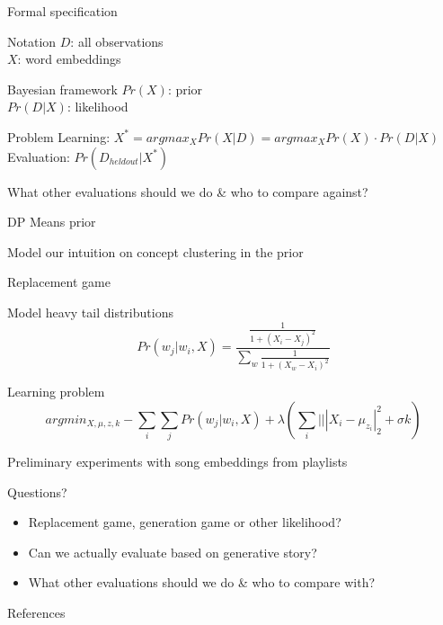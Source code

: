 \documentclass{beamer}
\begin{document}
\begin{frame}{Formal specification}
  \begin{block}{Notation}
    $D$: all observations\\
    $X$: word embeddings
  \end{block}
  \begin{block}{Bayesian framework}
    $Pr(X)$: prior\\
    $Pr(D | X)$: likelihood
  \end{block}
  \begin{block}{Problem}
    Learning: $X^* = argmax_{ X } Pr(X | D) = argmax_{ X } Pr(X) \cdot Pr(D | X)$\\
    Evaluation: $Pr(D_{heldout}|X^*)$
  \end{block}
\pause
What other evaluations should we do \& who to compare against?
\end{frame}

\begin{frame}{DP Means prior}
  \begin{block}{Model our intuition on concept clustering in the prior}
  \end{block}
\end{frame}

\begin{frame}{Replacement game}
  \begin{block}{Model heavy tail distributions}
    $$Pr(w_j|w_i, X) = \frac{\frac{1}{1+(X_i-X_j)^2}}{\sum_{w}\frac{1}{1+(X_w-X_i)^2}}$$
  \end{block}
  \pause
  \begin{block}{Learning problem}
    $$argmin_{X, \mu, z, k} -\sum_{i}\sum_{j}Pr(w_j|w_i, X)+\lambda(\sum_i|||X_i-\mu_{z_i}|_2^2 + \sigma k)$$
  \end{block}
\end{frame}

\begin{frame}{Preliminary experiments with song embeddings from playlists}
\end{frame}

\begin{frame}{Questions?}
  \begin{itemize}
    \item Replacement game, generation game or other likelihood?
    \item Can we actually evaluate based on generative story?
    \item What other evaluations should we do \& who to compare with?
  \end{itemize}
\end{frame}

\begin{frame}[allowframebreaks]{References}
  
  
\end{frame}
\end{document}
